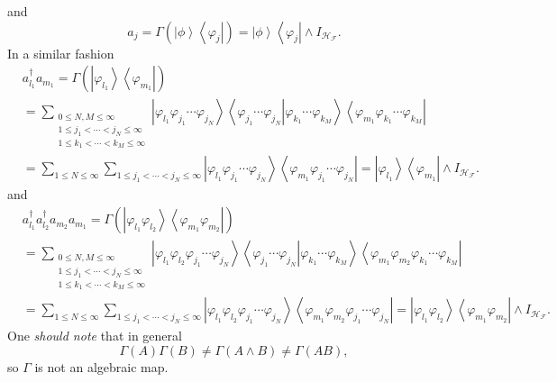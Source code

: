 \documentclass[aps,preprint]{revtex4}%
\begin{document}
and%
\begin{equation}
a_{j}=\Gamma\left(  \left\vert \phi\right\rangle \left\langle \varphi
_{j}\right\vert \right)  =\left\vert \phi\right\rangle \left\langle
\varphi_{j}\right\vert \wedge I_{\mathcal{H}_{\mathcal{F}}}.\nonumber
\end{equation}
In a similar fashion
\begin{align}
&  a_{l_{1}}^{\dagger}a_{m_{1}}=\Gamma\left(  \left\vert \varphi_{l_{1}%
}\right\rangle \left\langle \varphi_{m_{1}}\right\vert \right) \nonumber\\
&  =\sum_{\substack{0\leq N,M\leq\infty\\1\leq j_{1}<\cdots<j_{N}\leq
\infty\\1\leq k_{1}<\cdots<k_{M}\leq\infty}}\left\vert \varphi_{l_{1}}%
\varphi_{j_{1}}\cdots\varphi_{j_{N}}\right\rangle \left\langle \left.
\varphi_{j_{1}}\cdots\varphi_{j_{N}}\right\vert \varphi_{k_{1}}\cdots
\varphi_{k_{M}}\right\rangle \left\langle \varphi_{m_{1}}\varphi_{k_{1}}%
\cdots\varphi_{k_{M}}\right\vert \nonumber\\
&  =\sum_{1\leq N\leq\infty}\sum_{1\leq j_{1}<\cdots<j_{N}\leq\infty
}\left\vert \varphi_{l_{1}}\varphi_{j_{1}}\cdots\varphi_{j_{N}}\right\rangle
\left\langle \varphi_{m_{1}}\varphi_{j_{1}}\cdots\varphi_{j_{N}}\right\vert
=\left\vert \varphi_{l_{1}}\right\rangle \left\langle \varphi_{m_{1}%
}\right\vert \wedge I_{\mathcal{H}_{\mathcal{F}}}.
\end{align}
and%
\begin{align}
&  a_{l_{1}}^{\dagger}a_{l_{2}}^{\dagger}a_{m_{2}}a_{m_{1}}=\Gamma\left(
\left\vert \varphi_{l_{1}}\varphi_{l_{2}}\right\rangle \left\langle
\varphi_{m_{1}}\varphi_{m_{2}}\right\vert \right) \nonumber\\
&  =\sum_{\substack{0\leq N,M\leq\infty\\1\leq j_{1}<\cdots<j_{N}\leq
\infty\\1\leq k_{1}<\cdots<k_{M}\leq\infty}}\left\vert \varphi_{l_{1}}%
\varphi_{l_{2}}\varphi_{j_{1}}\cdots\varphi_{j_{N}}\right\rangle \left\langle
\left.  \varphi_{j_{1}}\cdots\varphi_{j_{N}}\right\vert \varphi_{k_{1}}%
\cdots\varphi_{k_{M}}\right\rangle \left\langle \varphi_{m_{1}}\varphi_{m_{2}%
}\varphi_{k_{1}}\cdots\varphi_{k_{M}}\right\vert \nonumber\\
&  =\sum_{1\leq N\leq\infty}\sum_{1\leq j_{1}<\cdots<j_{N}\leq\infty
}\left\vert \varphi_{l_{1}}\varphi_{l_{2}}\varphi_{j_{1}}\cdots\varphi_{j_{N}%
}\right\rangle \left\langle \varphi_{m_{1}}\varphi_{m_{2}}\varphi_{j_{1}%
}\cdots\varphi_{j_{N}}\right\vert =\left\vert \varphi_{l_{1}}\varphi_{l_{2}%
}\right\rangle \left\langle \varphi_{m_{1}}\varphi_{m_{2}}\right\vert \wedge
I_{\mathcal{H}_{\mathcal{F}}}.
\end{align}
One \emph{should note} that in general
\begin{equation}
\Gamma\left(  A\right)  \Gamma\left(  B\right)  \neq\Gamma\left(  A\wedge
B\right)  \neq\Gamma\left(  AB\right)  ,
\end{equation}
so $\Gamma$ is not an algebraic map.
\end{document}
